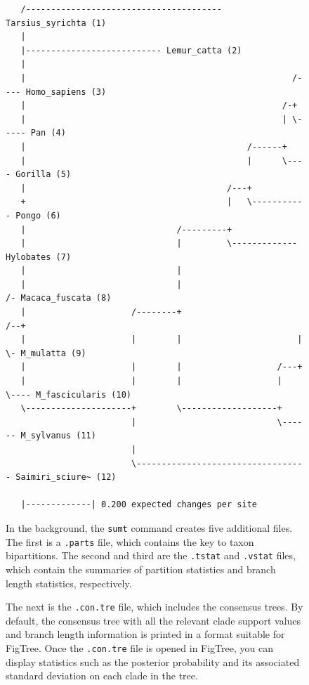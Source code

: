 \documentclass[12pt]{book}
\newcommand{\ttt}[1]{\texttt{#1}}
\begin{document}
\begin{figure}[h]
\begin{singlespacing}
\begin{verbatim}
   /--------------------------------------- Tarsius_syrichta (1)
   |                                                                               
   |--------------------------- Lemur_catta (2)
   |                                                                               
   |                                                     /---- Homo_sapiens (3)
   |                                                   /-+                         
   |                                                   | \----- Pan (4)
   |                                            /------+                           
   |                                            |      \---- Gorilla (5)
   |                                        /---+                                  
   +                                        |   \----------- Pongo (6)
   |                              /---------+                                      
   |                              |         \------------- Hylobates (7)
   |                              |                                                
   |                              |                          /- Macaca_fuscata (8)
   |                     /--------+                       /--+                     
   |                     |        |                       |  \- M_mulatta (9)
   |                     |        |                   /---+                        
   |                     |        |                   |   \---- M_fascicularis (10)
   \---------------------+        \-------------------+                            
                         |                            \------ M_sylvanus (11)
                         |                                                         
                         \---------------------------------- Saimiri_sciure~ (12)
                                                                                   
   |-------------| 0.200 expected changes per site
\end{verbatim}
\normalsize
\end{singlespacing}

In the background, the \ttt{sumt} command creates five additional files. The first is a
\ttt{.parts} file, which contains the key to taxon bipartitions. The second and third are the
\ttt{.tstat} and \ttt{.vstat} files, which contain the summaries of partition statistics and branch
length statistics, respectively.

The next is the \ttt{.con.tre} file, which includes the consensus trees. By default, the consensus
tree with all the relevant clade support values and branch length information is printed in a
format suitable for FigTree. Once the \ttt{.con.tre} file is opened in FigTree, you can display
statistics such as the posterior probability and its associated standard deviation on each clade in
the tree.


\end{figure}
\end{document}

